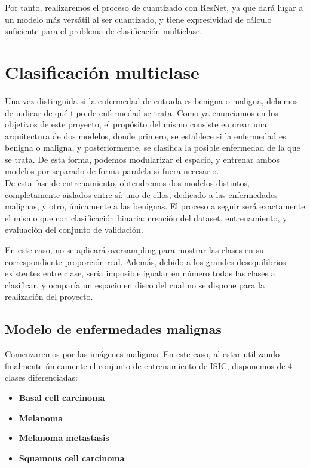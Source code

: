 Por tanto, realizaremos el proceso de cuantizado con ResNet, ya que dará lugar a un modelo más versátil al ser cuantizado, y tiene expresividad de cálculo suficiente para el problema de clasificación multiclase. 


\section {Clasificación multiclase}

Una vez distinguida si la enfermedad de entrada es benigna o maligna, debemos de indicar de qué tipo de enfermedad se trata.  Como ya enunciamos en los objetivos de este proyecto, el propósito  del mismo consiste en crear una arquitectura de dos modelos, donde primero, se establece si la enfermedad es benigna o maligna, y posteriormente, se clasifica la posible enfermedad de la que se trata. De esta forma, podemos modularizar el espacio, y entrenar ambos modelos por separado de forma paralela si fuera necesario.\\

De esta fase de entrenamiento, obtendremos dos modelos distintos, completamente aislados entre sí: uno de ellos, dedicado a las enfermedades malignas, y otro, únicamente a las benignas. El proceso a seguir será exactamente el mismo que con clasificación binaria: creación del dataset, entrenamiento, y evaluación del conjunto de validación.

En este caso, no se aplicará oversampling para mostrar las clases en su correspondiente proporción real.  Además, debido a los grandes desequilibrios existentes entre clase, sería imposible igualar en número todas las clases a clasificar, y ocuparía un espacio en disco del cual no se dispone para la realización del proyecto.

\subsection{Modelo de enfermedades malignas}

Comenzaremos por las imágenes malignas. En este caso, al estar utilizando finalmente únicamente el conjunto de entrenamiento de ISIC, disponemos de 4 clases diferenciadas:

\begin{itemize}
	\item \textbf{Basal cell carcinoma}
	\item \textbf{Melanoma}
	\item \textbf{Melanoma metastasis}
	\item \textbf{Squamous cell carcinoma}
	
\end{itemize}


